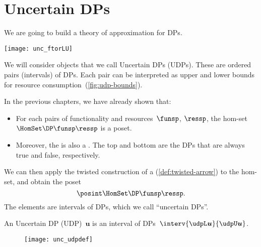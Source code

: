 \section{Uncertain DPs}

We are going to build a theory of approximation for DPs.

\begin{marginfigure}
    \texttt{[image: unc\_ftorLU]}
    \caption{}
    \label{fig:udp-bounds}
\end{marginfigure}

We will consider objects that we call Uncertain DPs (UDPs).
These are ordered pairs (intervals) of DPs.
Each pair can be interpreted as upper and lower bounds for resource consumption~(\cref{fig:udp-bounds}).


In the previous chapters, we have already shown that:
\begin{itemize}
    \item For each pairs of functionality and resources~$\funsp$, $\ressp$, the hom-set~$\HomSet\DP\funsp\ressp$
          is a poset.
    \item Moreover, the  is also a .
          The top and bottom are the DPs that are always true and false, respectively.
\end{itemize}

We can then apply the twisted construction of a  (\cref{def:twisted-arrow}) to the hom-set, and obtain the poset
\begin{equation}
    \posint \HomSet\DP\funsp\ressp.
\end{equation}
%
The elements are intervals of DPs, which we call ``uncertain DPs''.

\begin{definition}\label{def:uncertain-dp}
    An Uncertain DP (UDP)~$\boldsymbol{u}$ is an interval of DPs~$\interv{\udpL\boldsymbol{u}}{\udpU\boldsymbol{u}}$.
\end{definition}

\begin{figure}[h!]
    \texttt{[image: unc\_udpdef]}
    \caption{}
\end{figure}

